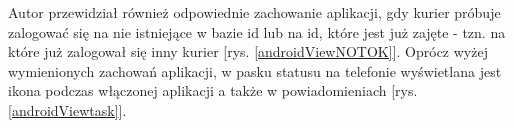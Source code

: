 \documentclass[eng,printmode,oneside]{mgr}
\begin{document}
Autor przewidział również odpowiednie zachowanie aplikacji, gdy kurier próbuje
zalogować się na nie istniejące w bazie id lub na id, które jest już zajęte -
tzn. na które już zalogował się inny kurier [rys. \ref{androidViewNOTOK}]. 
Oprócz wyżej wymienionych zachowań aplikacji, w pasku statusu na telefonie
wyświetlana jest ikona podczas włączonej aplikacji a także w
powiadomieniach [rys. \ref{androidViewtask}].

\begin{figure}
\centering
\captionsetup{justification=centering,margin=1cm}

\end{figure}
\end{document}
